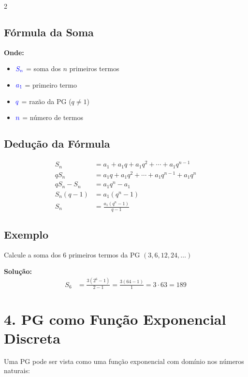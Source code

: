 \documentclass[11pt]{article}
\begin{document}
\begin{multicols}{2}
\subsection*{Fórmula da Soma}


\vspace{5mm}

\textbf{Onde:}
\begin{itemize}
\item $\textcolor{blue}{S_n}$ = soma dos $n$ primeiros termos
\item $\textcolor{blue}{a_1}$ = primeiro termo
\item $\textcolor{blue}{q}$ = razão da PG ($q \neq 1$)
\item $\textcolor{blue}{n}$ = número de termos
\end{itemize}

\subsection*{Dedução da Fórmula}
\begin{align*}
S_n &= a_1 + a_1q + a_1q^2 + \cdots + a_1q^{n-1} \\
qS_n &= a_1q + a_1q^2 + \cdots + a_1q^{n-1} + a_1q^n \\
\hline
qS_n - S_n &= a_1q^n - a_1 \\
S_n(q - 1) &= a_1(q^n - 1) \\
S_n &= \frac{a_1(q^n - 1)}{q - 1}
\end{align*}

\subsection*{Exemplo}
Calcule a soma dos 6 primeiros termos da PG $(3, 6, 12, 24, \ldots)$

\textbf{Solução:}
\begin{align*}
S_6 &= \frac{3(2^6 - 1)}{2 - 1} = \frac{3(64 - 1)}{1} = 3 \cdot 63 = 189
\end{align*}

\section*{4. PG como Função Exponencial Discreta}
Uma PG pode ser vista como uma função exponencial com domínio nos números naturais:


\end{multicols}
\end{document}
